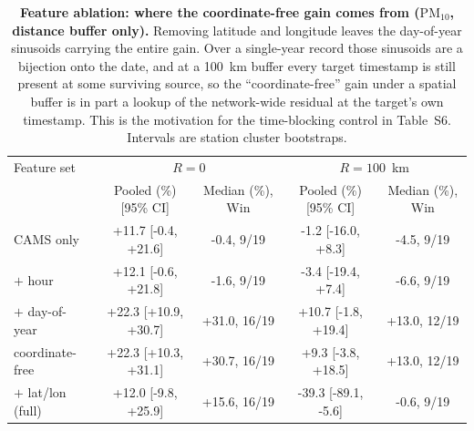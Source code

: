 \documentclass[11pt]{article}
\newcommand*{\pmten}{\ensuremath{\mathrm{PM_{10}}}}
\begin{document}
\begin{table}[htbp]\centering\footnotesize
\caption{\textbf{Feature ablation: where the coordinate-free gain comes from (\pmten{}, distance buffer only).} Removing latitude and longitude leaves the day-of-year sinusoids carrying the entire gain. Over a single-year record those sinusoids are a bijection onto the date, and at a 100~km buffer every target timestamp is still present at some surviving source, so the ``coordinate-free'' gain under a spatial buffer is in part a lookup of the network-wide residual at the target's own timestamp. This is the motivation for the time-blocking control in Table~S6. Intervals are station cluster bootstraps.}
\begin{tabular}{lcccc}\toprule
Feature set & \multicolumn{2}{c}{$R=0$} & \multicolumn{2}{c}{$R=100$~km} \\
 & Pooled (\%) [95\% CI] & Median (\%), Win & Pooled (\%) [95\% CI] & Median (\%), Win \\ \midrule
CAMS only & +11.7 [-0.4, +21.6] & -0.4, 9/19 & -1.2 [-16.0, +8.3] & -4.5, 9/19 \\
$+$ hour & +12.1 [-0.6, +21.8] & -1.6, 9/19 & -3.4 [-19.4, +7.4] & -6.6, 9/19 \\
$+$ day-of-year & +22.3 [+10.9, +30.7] & +31.0, 16/19 & +10.7 [-1.8, +19.4] & +13.0, 12/19 \\
coordinate-free & +22.3 [+10.3, +31.1] & +30.7, 16/19 & +9.3 [-3.8, +18.5] & +13.0, 12/19 \\
$+$ lat/lon (full) & +12.0 [-9.8, +25.9] & +15.6, 16/19 & -39.3 [-89.1, -5.6] & -0.6, 9/19 \\
\bottomrule\end{tabular}\end{table}
\end{document}
